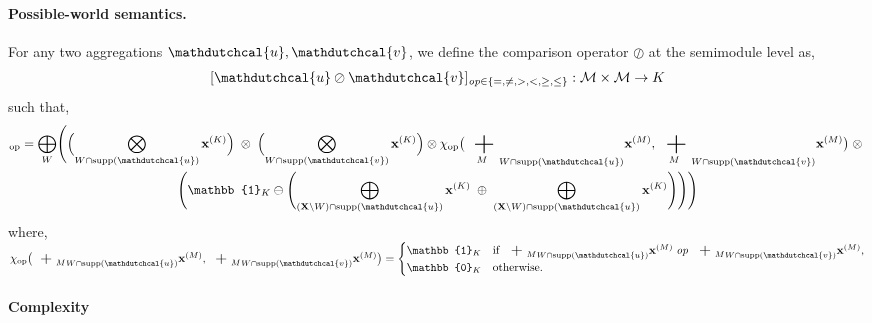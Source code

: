 \paragraph{Possible-world semantics.}
For any two aggregations $\mathdutchcal{u},\mathdutchcal{v}$, we define the comparison operator $\oslash$ at the semimodule level as, 
\[
[\mathdutchcal{u} \oslash \mathdutchcal{v}]_{\mathit{op}\in\{ =, \neq , >, <, \geq, \leq\}}:\mathcal{M} \times \mathcal{M} \rightarrow K 
\]
such that,
\begin{multline}
[\mathdutchcal{u} \oslash \mathdutchcal{v}]_{\mathrm{op}}=
\bigoplus_{W} 
\Biggl(
  \Bigl( \bigotimes_{W\cap\mathrm{supp}(\mathdutchcal{u})} \mathbf{x}^{(K)} \Bigr) \;\otimes\; \Bigl( \bigotimes_{W\cap\mathrm{supp}(\mathdutchcal{v})} \mathbf{x}^{(K)} \Bigr)
\otimes
  \chi_{\mathrm{op}}\bigl(  {\bigplus_M}_{W\cap\mathrm{supp}(\mathdutchcal{u})} \mathbf{x}^{(M)}, {\bigplus_M}_{W\cap\mathrm{supp}(\mathdutchcal{v})} \mathbf{x}^{(M)}   \bigr)
\;\otimes\;\\
  \Biggl(\mathbb{1}_K \ominus \Biggl( \bigoplus_{(\mathbf{X}\setminus W)\cap\mathrm{supp}(\mathdutchcal{u})} \mathbf{x}^{(K)} \;\oplus\; \bigoplus_{(\mathbf{X}\setminus W)\cap\mathrm{supp}(\mathdutchcal{u})} \mathbf{x}^{(K)} \Biggr)\Biggr)
\Biggr)
\end{multline}
where,
$\chi_{\mathrm{op}}\bigl(  {\bigplus_M}_{W\cap\mathrm{supp}(\mathdutchcal{u})} \mathbf{x}^{(M)}, {\bigplus_M}_{W\cap\mathrm{supp}(\mathdutchcal{v})} \mathbf{x}^{(M)}   \bigr)=
\begin{cases}
\mathbb{1}_K & \text{if } {\bigplus_M}_{W\cap\mathrm{supp}(\mathdutchcal{u})} \mathbf{x}^{(M)}\;\mathit{op}\;{\bigplus_M}_{W\cap\mathrm{supp}(\mathdutchcal{v})} \mathbf{x}^{(M)},\\
\mathbb{0}_K & \text{otherwise.}
\end{cases}$ 
\paragraph{Complexity}

